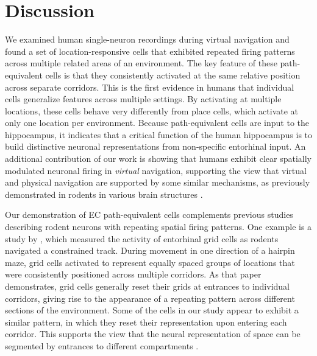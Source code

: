 \section{Discussion}

We examined human single-neuron recordings during virtual navigation and found a set of location-responsive cells that exhibited repeated firing patterns across multiple related areas of an environment. The key feature of these path-equivalent cells is that they consistently activated at the same relative position across separate corridors.  This  is the first evidence in humans that individual cells  generalize features across multiple  settings.  By activating at multiple locations, these cells behave very differently from place cells, which activate at only one location per environment. Because path-equivalent cells are input to the hippocampus, it indicates that a critical function of the human hippocampus is to build distinctive neuronal representations from non-specific entorhinal input. An additional contribution of our work is showing that  humans exhibit clear spatially modulated neuronal firing in \emph{virtual} navigation, supporting the view that virtual and physical navigation are supported by some similar mechanisms, as previously  demonstrated in rodents in various brain structures \cite{AghaEtal14,HarvEtal09,RavaEtal13}.


Our demonstration of EC path-equivalent cells complements previous studies describing rodent neurons with repeating spatial firing patterns. One example is a study by \citet{DerdEtal09}, which measured the activity of entorhinal grid cells as rodents navigated a constrained track. During movement in one direction of a hairpin maze, grid cells activated to represent equally spaced groups of locations that were consistently positioned across multiple corridors. As that paper demonstrates, grid cells generally reset their grids at  entrances to individual corridors,  giving rise to the appearance of a repeating  pattern across different sections of the environment. Some of the cells in our study appear to exhibit a similar pattern, in which they reset their representation upon entering each corridor. This supports the view that the neural representation of space can be segmented by  entrances to different compartments  \cite{FranEtal00,SpieEtal13}.  

